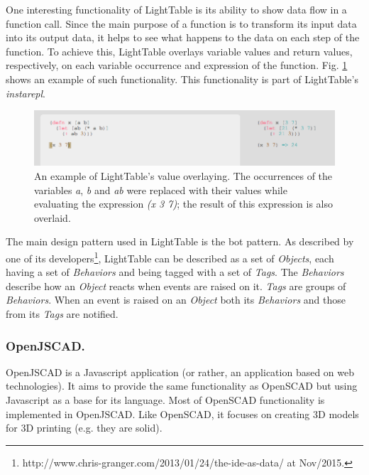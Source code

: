 \documentclass{./llncs2e/llncs}
\begin{document}
	One interesting functionality of LightTable is its ability to show data flow in a function call. 
	Since the main purpose of a function is to transform its input data into its output data, it helps to see what happens to the data on each step of the function. 
	To achieve this, LightTable overlays variable values and return values, respectively, on each variable occurrence and expression of the function. 
	Fig. \ref{fig:lt:val:overlay} shows an example of such functionality. 
	This functionality is part of LightTable's \emph{instarepl}.

	\begin{figure}
		\centering
		\includegraphics[width=1.0\textwidth]{img/lt_val_overlay__inv}
			\caption{An example of LightTable's value overlaying. The occurrences of the variables \emph{a}, \emph{b} and \emph{ab} were replaced with their values while evaluating the expression \emph{(x 3 7)}; the result of this expression is also overlaid.}
		\label{fig:lt:val:overlay}
	\end{figure}

	The main design pattern used in LightTable is the \ac{bot} pattern. 
	As described by one of its developers\footnote{http://www.chris-granger.com/2013/01/24/the-ide-as-data/ at Nov/2015.}, LightTable can be described as a set of \emph{Objects}, each having a set of \emph{Behaviors} and being tagged with a set of \emph{Tags}. 
	The \emph{Behaviors} describe how an \emph{Object} reacts when events are raised on it. \emph{Tags} are groups of \emph{Behaviors}. 
	When an event is raised on an \emph{Object} both its \emph{Behaviors} and those from its \emph{Tags} are notified.

\subsubsection{OpenJSCAD.}
	OpenJSCAD\cite{openjscad2015site} is a Javascript application (or rather, an application based on web technologies).
	It aims to provide the same functionality as OpenSCAD but using Javascript as a base for its language. 
	Most of OpenSCAD functionality is implemented in OpenJSCAD. 
	Like OpenSCAD, it focuses on creating 3D models for 3D printing (e.g. they are solid).
\end{document}
